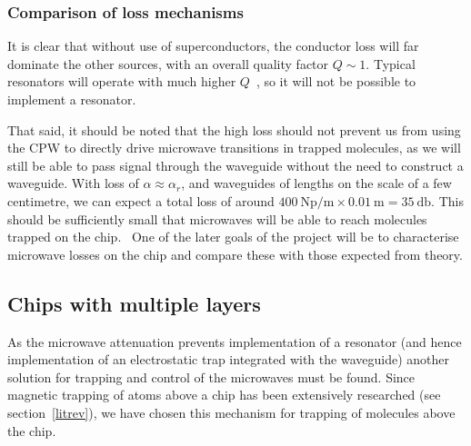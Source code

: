 \subsubsection*{Comparison of loss mechanisms}

It is clear that without use of superconductors, the conductor loss will far
dominate the other sources, with an overall quality factor $Q\sim1$. Typical
resonators will operate with much higher $Q$~\cite{Hattermann2017}, so it will
not be possible to implement a resonator.

That said, it should be noted that the high loss should not prevent us from
using the CPW to directly drive microwave transitions in trapped molecules, as
we will still be able to pass signal through the waveguide without the need to
construct a waveguide. With loss of $\alpha \approx \alpha_r$, and waveguides of
lengths on the scale of a few centimetre, we can expect a total loss of around
$\SI{400}{\neper\per\metre} \times \SI{0.01}{\metre} = \SI{35}{\decibel}$. This
should be sufficiently small that microwaves will be able to reach molecules
trapped on the chip.~\cite{Treutlein2008}
One of the later goals of the project will be to characterise microwave losses
on the chip and compare these with those expected from theory.
%

\subsection{Chips with multiple layers}
\label{experiment:multilayer}

As the microwave attenuation prevents implementation of a resonator (and hence
implementation of an electrostatic trap integrated with the waveguide) another
solution for trapping and control of the microwaves must be found. Since
magnetic trapping of atoms above a chip has been extensively researched (see
section~\ref{litrev}), we have chosen this mechanism for trapping of molecules
above the chip.

